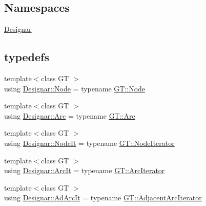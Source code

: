 \subsection*{Namespaces}
\begin{DoxyCompactItemize}
\item 
 \hyperlink{namespace_designar}{Designar}
\end{DoxyCompactItemize}
\subsection*{typedefs}
\begin{DoxyCompactItemize}
\item 
{\footnotesize template$<$class GT $>$ }\\using \hyperlink{namespace_designar_a5af326c65aa2bd26b26c410f2030d09e}{Designar\+::\+Node} = typename \hyperlink{class_designar_1_1_graph_a5dfc7dba9d092ac489c72e40390c37d0}{G\+T\+::\+Node}
\item 
{\footnotesize template$<$class GT $>$ }\\using \hyperlink{namespace_designar_a3f55fb5513d62ff47cbc8f72b8e95d6f}{Designar\+::\+Arc} = typename \hyperlink{class_designar_1_1_graph_a74c730ef4ce2d20f998d72bd25c2b5bf}{G\+T\+::\+Arc}
\item 
{\footnotesize template$<$class GT $>$ }\\using \hyperlink{namespace_designar_a5fdef28ed7c6b948482379ebabf927ce}{Designar\+::\+Node\+It} = typename \hyperlink{class_designar_1_1_graph_1_1_node_iterator}{G\+T\+::\+Node\+Iterator}
\item 
{\footnotesize template$<$class GT $>$ }\\using \hyperlink{namespace_designar_a30ebaaade3ffa312c33d6e1234a96952}{Designar\+::\+Arc\+It} = typename \hyperlink{class_designar_1_1_graph_1_1_arc_iterator}{G\+T\+::\+Arc\+Iterator}
\item 
{\footnotesize template$<$class GT $>$ }\\using \hyperlink{namespace_designar_a88b020661576bc09a536766283ec1790}{Designar\+::\+Ad\+Arc\+It} = typename \hyperlink{class_designar_1_1_graph_1_1_adjacent_arc_iterator}{G\+T\+::\+Adjacent\+Arc\+Iterator}
\end{DoxyCompactItemize}
